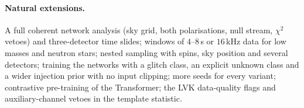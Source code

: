 \paragraph{Natural extensions.} A full coherent network analysis (sky grid, both polarisations, null stream, $\chi^2$ vetoes) and three-detector time slides; windows of $4$--$8\,$s or $16\,$kHz data for low masses and neutron stars; nested sampling with spins, sky position and several detectors; training the networks with a glitch class, an explicit unknown class and a wider injection prior with no input clipping; more seeds for every variant; contrastive pre-training of the Transformer; the LVK data-quality flags and auxiliary-channel vetoes in the template statistic.
